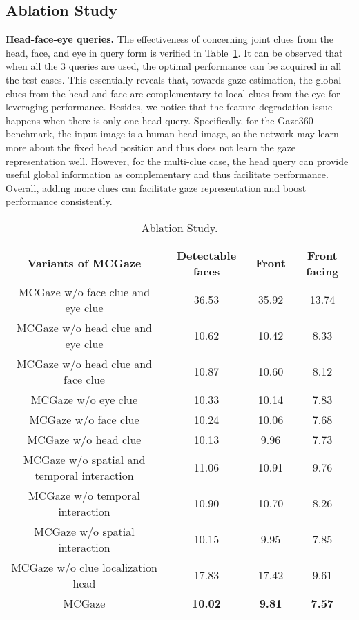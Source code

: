 \documentclass[journal]{IEEEtran}
\begin{document}
\subsection{Ablation Study}
\textbf{Head-face-eye queries.} The effectiveness of concerning joint clues from the head, face, and eye in query form is verified in Table~\ref{tab: ablation1}. It can be observed that when all the 3 queries are used, the optimal performance can be acquired in all the test cases. This essentially reveals that, towards gaze estimation, the global clues from the head and face are complementary to local clues from the eye for leveraging performance. Besides, we notice that the feature degradation issue happens when there is only one head query. Specifically, for the Gaze360 benchmark, the input image is a human head image, so the network may learn more about the fixed head position and thus does not learn the gaze representation well. However, for the multi-clue case, the head query can provide useful global information as complementary and thus facilitate performance. Overall, adding more clues can facilitate gaze representation and boost performance consistently. 
\begin{table}[t]
\tiny
\vspace{-6mm}
\setlength{\abovecaptionskip}{0cm}  \setlength{\belowcaptionskip}{-0.2cm} \caption{Ablation Study.}
\centering

\setlength{\tabcolsep}{3pt}
\begin{tabular}{c|ccc}
\hline
Variants of MCGaze& Detectable faces & Front & Front facing\\
\hline
 MCGaze w/o face clue and eye clue  & 36.53 & 35.92  & 13.74  \\
 MCGaze w/o head clue and eye clue  & 10.62 & 10.42 & 8.33 \\
 MCGaze w/o head clue and face clue  & 10.87 & 10.60 & 8.12 \\
 MCGaze w/o eye clue  & 10.33 & 10.14 & 7.83 \\
 MCGaze w/o face clue   & 10.24 & 10.06 & 7.68 \\
 MCGaze w/o head clue  & 10.13 & 9.96 & 7.73 \\
 \hline
 MCGaze w/o spatial and temporal interaction  & 11.06 & 10.91 & 9.76\\
 MCGaze w/o temporal interaction  & 10.90 & 10.70 & 8.26\\
 MCGaze w/o spatial interaction  & 10.15 & 9.95 & 7.85\\
 \hline
 MCGaze w/o clue localization head  & 17.83 & 17.42 & 9.61\\
 \hline
MCGaze & \textbf{10.02} & \textbf{9.81} & \textbf{7.57} \\
 \hline
\end{tabular}
\label{tab: ablation1}
\vspace{-6mm}
\end{table}
\end{document}
